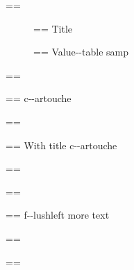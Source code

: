\documentclass{book}
\makeatletter
\newcommand\Texinfotablestylesamp[1]{\ifstrempty{#1}{}{`\texttt{#1}'}}%
\newenvironment{Texinfopreformatted}{%
  \par\GNUTobeylines\obeyspaces\frenchspacing\parskip=\z@\parindent=\z@}{}
{\catcode`\^^M=13 \gdef\GNUTobeylines{\catcode`\^^M=13 \def^^M{\null\par}}}
\newenvironment{Texinfoindented}{\begin{list}{}{}\item\relax}{\end{list}}
\renewcommand{\_}{\Texinfounderscore\discretionary{}{}{}}
\makeatother
\begin{document}
{{\begin{Texinfoindented}
\begin{description}
\end{description}
\begin{Texinfopreformatted}%
\ttfamily 
\end{Texinfopreformatted}
\begin{description}
\item[] \begin{Texinfopreformatted}%
\ttfamily Title
\end{Texinfopreformatted}
\item[{\parbox[b]{\linewidth}{%
\Texinfotablestylesamp{a{-}{-}samp}\\
\Texinfotablestylesamp{a2{-}{-}samp}}}]
\begin{Texinfopreformatted}%
\ttfamily Value{-}{-}table samp
\end{Texinfopreformatted}
\end{description}
\begin{Texinfopreformatted}%
\ttfamily 
\end{Texinfopreformatted}
\begin{Texinfocartouche}
\begin{Texinfopreformatted}%
\ttfamily c{-}{-}artouche
\end{Texinfopreformatted}
\end{Texinfocartouche}
\begin{Texinfopreformatted}%
\ttfamily 
\end{Texinfopreformatted}
\begin{Texinfocartouche}[title={Tit--le \emph{of box}}]
\begin{Texinfopreformatted}%
\ttfamily With title c{-}{-}artouche
\end{Texinfopreformatted}
\end{Texinfocartouche}
\begin{Texinfopreformatted}%
\ttfamily 
\end{Texinfopreformatted}
\begin{flushleft}
\begin{Texinfopreformatted}%
\begin{Texinfopreformatted}%
\ttfamily f{-}{-}lushleft
more text
\end{Texinfopreformatted}
\end{Texinfopreformatted}
\end{flushleft}
\begin{Texinfopreformatted}%
\ttfamily 
\end{Texinfopreformatted}
\begin{flushright}
\begin{Texinfopreformatted}%

\end{Texinfopreformatted}
\end{flushright}
\end{Texinfoindented}}}
\end{document}

